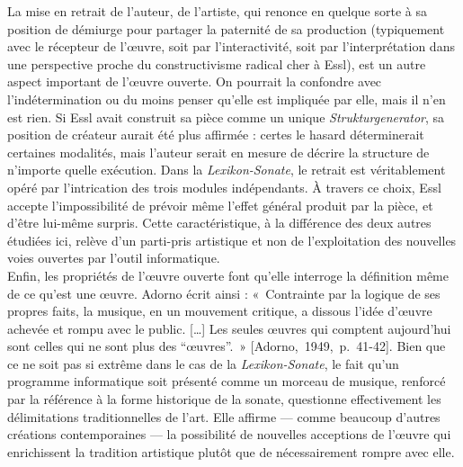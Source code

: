 \documentclass[a4paper,12pt]{article}
\newcommand{\guill}[1]{«~#1~»}
\newcommand{\guilldeux}[1]{“#1”}
\newcommand{\cicite}[1]{{\footnotesize[#1]}}
\begin{document}
La mise en retrait de l'auteur, de l'artiste, qui renonce en quelque sorte à sa position de démiurge pour partager la paternité de sa production (typiquement avec le récepteur de l'œuvre, soit par l'interactivité, soit par l'interprétation dans une perspective proche du constructivisme radical cher à Essl), est un autre aspect important de l'œuvre ouverte. On pourrait la confondre avec l'indétermination ou du moins penser qu'elle est impliquée par elle, mais il n'en est rien. Si Essl avait construit sa pièce comme un unique \emph{Strukturgenerator}, sa position de créateur aurait été plus affirmée : certes le hasard déterminerait certaines modalités, mais l'auteur serait en mesure de décrire la structure de n'importe quelle exécution. Dans la \emph{Lexikon-Sonate}, le retrait est véritablement opéré par l'intrication des trois modules indépendants. À travers ce choix, Essl accepte l'impossibilité de prévoir même l'effet général produit par la pièce, et d'être lui-même surpris. Cette caractéristique, à la différence des deux autres étudiées ici, relève d'un parti-pris artistique et non de l'exploitation des nouvelles voies ouvertes par l'outil informatique. \\
Enfin, les propriétés de l'œuvre ouverte font qu'elle interroge la définition même de ce qu'est une œuvre. Adorno écrit ainsi : \guill{Contrainte par la logique de ses propres faits, la musique, en un mouvement critique, a dissous l'idée d'œuvre achevée et rompu avec le public. [\dots] Les seules œuvres qui comptent aujourd'hui sont celles qui ne sont plus des \guilldeux{œuvres}.} \cicite{Adorno,~1949,~p.~41-42}. Bien que ce ne soit pas si extrême dans le cas de la \emph{Lexikon-Sonate}, le fait qu'un programme informatique soit présenté comme un morceau de musique, renforcé par la référence à la forme historique de la sonate, questionne effectivement les délimitations traditionnelles de l'art. Elle affirme --- comme beaucoup d'autres créations contemporaines --- la possibilité de nouvelles acceptions de l'œuvre qui enrichissent la tradition artistique plutôt que de nécessairement rompre avec elle. \\
\end{document}
